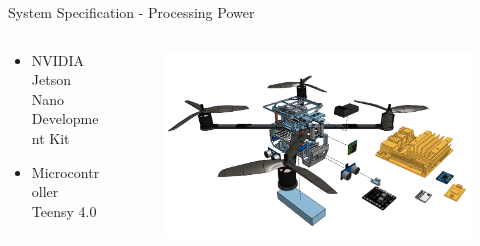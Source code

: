 \begin{frame}{System Specification - Processing Power}


    \begin{columns}
        \begin{column}{0.4\textwidth}
        \begin{itemize}
            \item NVIDIA Jetson Nano Development Kit
            \item Microcontroller Teensy 4.0
        \end{itemize}
        \end{column}
        \begin{column}{0.6\textwidth}  %
            \begin{figure}
                \centering
                \includegraphics[width=1\textwidth]{img/exploded-processing.png}
                \label{fig:processing}
            \end{figure}
        \end{column}
    \end{columns}
\end{frame}

